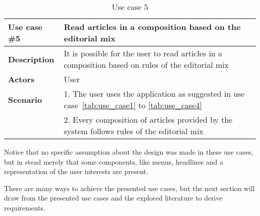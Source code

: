 \begin{table}[h!tp]
\myfloatalign
	\begin{tabular}{p{}|p{}} \toprule 
		\textbf{Use case \#5} & Read articles in a composition based on the editorial mix\\ \midrule
		\textbf{Description} & It is possible for the user to read articles in a composition based on rules of the editorial mix\\ \midrule
		\textbf{Actors} & User\\ \midrule
		\textbf{Scenario} 	& 1. The user uses the application as suggested in use case~\ref{tab:use_case1} to \ref{tab:use_case4}\\
								& 2. Every composition of articles provided by the system follows rules of the editorial mix\\
								\bottomrule
	\end{tabular}
\caption{Use case 5}
\label{tab:use_case5}
\end{table}

Notice that no specific assumption about the design was made in these use cases, but in stead merely that some components, like menus, headlines and a representation of the user interests are present.

There are many ways to achieve the presented use cases, but the next section will draw from the presented use cases and the explored literature to derive requirements.
%
%
%
%
%

